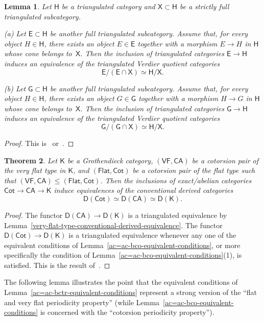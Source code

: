\documentclass[12pt,a4paper]{amsart}
\newcommand{\+}{\nobreakdash-}
\renewcommand{\:}{\colon}
\newcommand{\rarrow}{\longrightarrow}
\newcommand{\sD}{\mathsf D}
\newcommand{\sE}{\mathsf E}
\newcommand{\sG}{\mathsf G}
\newcommand{\sH}{\mathsf H}
\newcommand{\sK}{\mathsf K}
\newcommand{\sX}{\mathsf X}
\newcommand{\VF}{\mathsf{VF}}
\newcommand{\CA}{\mathsf{CA}}
\newcommand{\Flat}{\mathsf{Flat}}
\newcommand{\Cot}{\mathsf{Cot}}
\theoremstyle{plain}
\newtheorem{thm}{Theorem}[section]
\newtheorem{lem}[thm]{Lemma}
\theoremstyle{definition}
\begin{document}
\begin{lem} \label{triangulated-quotient-lemma}
 Let\/ $\sH$ be a triangulated category and\/ $\sX\subset\sH$ be
a strictly full triangulated subcategory. \par
\textup{(a)} Let\/ $\sE\subset\sH$ be another full triangulated
subcategory.
 Assume that, for every object $H\in\sH$, there exists an object
$E\in\sE$ together with a morphism $E\rarrow H$ in\/ $\sH$ whose
cone belongs to\/~$\sX$.
 Then the inclusion of triangulated categories\/ $\sE\rarrow\sH$
induces an equivalence of the triangulated Verdier quotient categories
$$
 \sE/(\sE\cap\sX)\simeq\sH/\sX.
$$ \par
\textup{(b)} Let\/ $\sG\subset\sH$ be another full triangulated
subcategory.
 Assume that, for every object $H\in\sH$, there exists an object
$G\in\sG$ together with a morphism $H\rarrow G$ in\/ $\sH$ whose
cone belongs to\/~$\sX$.
 Then the inclusion of triangulated categories\/ $\sG\rarrow\sH$
induces an equivalence of the triangulated Verdier quotient categories
$$
 \sG/(\sG\cap\sX)\simeq\sH/\sX.
$$
\end{lem}

\begin{proof}
 This is~\cite[Corollary~10.2.7]{KS} or~\cite[Lemma~1.6]{Pkoszul}.
\end{proof}

\begin{thm} \label{flat-type-conventional-derived-equivalence-theorem}
 Let\/ $\sK$ be a Grothendieck category, $(\VF,\CA)$ be a cotorsion pair
of the very flat type in\/ $\sK$, and $(\Flat,\Cot)$ be a cotorsion pair
of the flat type such that $(\VF,\CA)\le(\Flat,\Cot)$.
 Then the inclusions of exact/abelian categories\/ $\Cot\rarrow\CA
\rarrow\sK$ induce equivalences of the conventional derived categories
$$
 \sD(\Cot)\simeq\sD(\CA)\simeq\sD(\sK).
$$
\end{thm}

\begin{proof}
 The functor $\sD(\CA)\rarrow\sD(\sK)$ is a triangulated equivalence by
Lemma~\ref{very-flat-type-conventional-derived-equivalence}.
 The functor $\sD(\Cot)\rarrow\sD(\sK)$ is a triangulated equivalence
whenever any one of the equivalent conditions of
Lemma~\ref{ac=ac-bco-equivalent-conditions}, or more specifically
the condition of Lemma~\ref{ac=ac-bco-equivalent-conditions}(1),
is satisfied.
 This is the result of~\cite[Proposition~10.6]{PS6}.
\end{proof}

 The following lemma illustrates the point that the equivalent
conditions of Lemma~\ref{ac=ac-bctr-equivalent-conditions} represent
a strong version of the ``flat and very flat periodicity property''
(while Lemma~\ref{ac=ac-bco-equivalent-conditions} is concerned with
the ``cotorsion periodicity property'').
\end{document}
